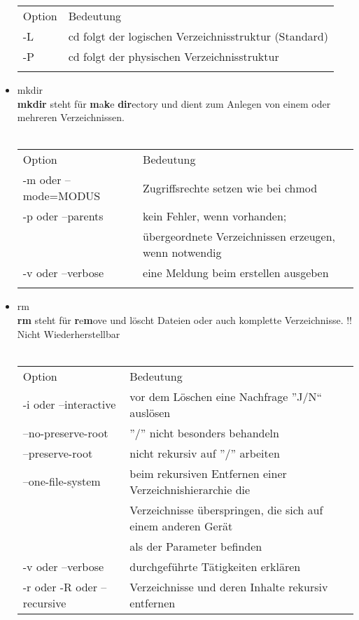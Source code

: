 \begin{itemize}
			\begin{tabular}{ll}
				Option & Bedeutung \\
				-L & cd folgt der logischen Verzeichnisstruktur (Standard)\\
				-P & cd folgt der physischen Verzeichnisstruktur\\ \\
			\end{tabular}
			\item mkdir\\
			\textbf{mkdir} steht f\"ur \textbf{m}a\textbf{k}e \textbf{dir}ectory und dient zum Anlegen von einem oder mehreren Verzeichnissen.\\  \\
			\begin{tabular}{ll}
				Option & Bedeutung \\
				-m oder --mode=MODUS & Zugriffsrechte setzen wie bei chmod\\
				-p oder --parents & kein Fehler, wenn vorhanden;\\
				 & übergeordnete Verzeichnissen erzeugen, wenn notwendig\\
				-v oder --verbose & eine Meldung beim erstellen ausgeben\\ \\
			\end{tabular}
			\newpage
			\item rm\\
			\textbf{rm} steht f\"ur \textbf{r}e\textbf{m}ove und l\"oscht Dateien oder auch komplette Verzeichnisse. !! Nicht Wiederherstellbar\\ \\
			\begin{tabular}{ll}
				Option & Bedeutung \\
				-i oder --interactive & vor dem L\"oschen eine Nachfrage ''J/N`` ausl\"osen\\
				--no-preserve-root & ''/'' nicht besonders behandeln\\
				--preserve-root & nicht rekursiv auf ''/'' arbeiten\\
				--one-file-system & beim rekursiven Entfernen einer Verzeichnishierarchie die\\
				 & Verzeichnisse überspringen, die sich auf einem anderen Gerät\\
				 & als der Parameter befinden\\
				-v oder --verbose & durchgef\"uhrte T\"atigkeiten erkl\"aren\\
				-r oder -R oder --recursive & Verzeichnisse und deren Inhalte rekursiv entfernen\\

\end{tabular}
\end{itemize}
